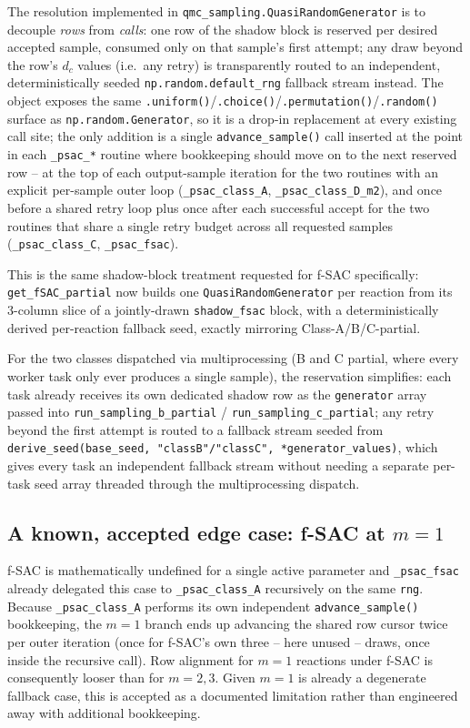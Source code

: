 \documentclass[11pt]{article}
\newcommand{\code}[1]{\texttt{#1}}
\begin{document}
The resolution implemented in \code{qmc\_sampling.QuasiRandomGenerator} is to decouple \emph{rows} from \emph{calls}: one row of the shadow block is reserved per desired accepted sample, consumed only on that sample's first attempt; any draw beyond the row's $d_c$ values (i.e.\ any retry) is transparently routed to an independent, deterministically seeded \code{np.random.default\_rng} fallback stream instead. The object exposes the same \code{.uniform()}/\code{.choice()}/\code{.permutation()}/\code{.random()} surface as \code{np.random.Generator}, so it is a drop-in replacement at every existing call site; the only addition is a single \code{advance\_sample()} call inserted at the point in each \code{\_psac\_*} routine where bookkeeping should move on to the next reserved row -- at the top of each output-sample iteration for the two routines with an explicit per-sample outer loop (\code{\_psac\_class\_A}, \code{\_psac\_class\_D\_m2}), and once before a shared retry loop plus once after each successful accept for the two routines that share a single retry budget across all requested samples (\code{\_psac\_class\_C}, \code{\_psac\_fsac}).

This is the same shadow-block treatment requested for f-SAC specifically: \code{get\_fSAC\_partial} now builds one \code{QuasiRandomGenerator} per reaction from its 3-column slice of a jointly-drawn \code{shadow\_fsac} block, with a deterministically derived per-reaction fallback seed, exactly mirroring Class-A/B/C-partial.

For the two classes dispatched via multiprocessing (B and C partial, where every worker task only ever produces a single sample), the reservation simplifies: each task already receives its own dedicated shadow row as the \code{generator} array passed into \code{run\_sampling\_b\_partial} / \code{run\_sampling\_c\_partial}; any retry beyond the first attempt is routed to a fallback stream seeded from \code{derive\_seed(base\_seed, "classB"/"classC", *generator\_values)}, which gives every task an independent fallback stream without needing a separate per-task seed array threaded through the multiprocessing dispatch.

\subsection{A known, accepted edge case: f-SAC at $m=1$}

f-SAC is mathematically undefined for a single active parameter and \code{\_psac\_fsac} already delegated this case to \code{\_psac\_class\_A} recursively on the same \code{rng}. Because \code{\_psac\_class\_A} performs its own independent \code{advance\_sample()} bookkeeping, the $m=1$ branch ends up advancing the shared row cursor twice per outer iteration (once for f-SAC's own three -- here unused -- draws, once inside the recursive call). Row alignment for $m=1$ reactions under f-SAC is consequently looser than for $m=2,3$. Given $m=1$ is already a degenerate fallback case, this is accepted as a documented limitation rather than engineered away with additional bookkeeping.
\end{document}
